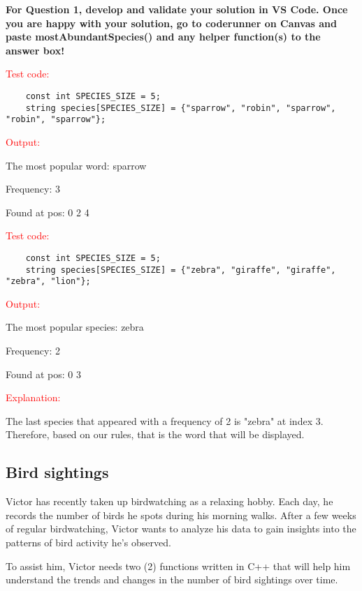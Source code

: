 \textbf{For Question 1, develop and validate your solution in VS Code. Once you are happy with your solution, go to coderunner on Canvas and paste mostAbundantSpecies() and any helper function(s) to the answer box!} 

\begin{sample}
    \textcolor{red}{Test code:}
    \begin{verbatim}
    const int SPECIES_SIZE = 5;
    string species[SPECIES_SIZE] = {"sparrow", "robin", "sparrow", "robin", "sparrow"};

\end{verbatim}
\textcolor{red}{Output:}

The most popular word: sparrow

Frequency: 3

Found at pos: 0 2 4

\end{sample}

\begin{sample}
\textcolor{red}{Test code:}
    \begin{verbatim}
    const int SPECIES_SIZE = 5;
    string species[SPECIES_SIZE] = {"zebra", "giraffe", "giraffe", "zebra", "lion"};

\end{verbatim}
\textcolor{red}{Output:}

The most popular species: zebra

Frequency: 2

Found at pos: 0 3


\textcolor{red}{Explanation:}

The last species that appeared with a frequency of 2 is "zebra" at index 3. Therefore, based on our rules, that is the word that will be displayed. 
\end{sample}


\subsection{Bird sightings}

Victor has recently taken up birdwatching as a relaxing hobby. Each day, he records the number of birds he spots during his morning walks. After a few weeks of regular birdwatching, Victor wants to analyze his data to gain insights into the patterns of bird activity he’s observed.

To assist him, Victor needs two (2) functions written in C++ that will help him understand the trends and changes in the number of bird sightings over time.

